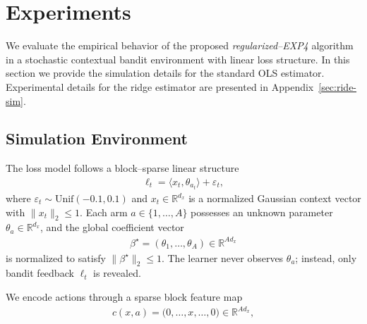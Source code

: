 \documentclass[11pt,letterpaper]{article}
\newcommand{\loss}{\ell}
\theoremstyle{plain}
\theoremstyle{definition}  %
\begin{document}
\section{Experiments}
\label{sec:exps}


We evaluate the empirical behavior of the proposed \emph{regularized–EXP4} algorithm in a stochastic contextual bandit environment with linear loss structure. In this section we provide the simulation details for the standard OLS estimator. Experimental details for the ridge estimator are presented in Appendix~\ref{sec:ride-sim}.

\subsection{Simulation Environment}


\noindent The loss model follows a block–sparse linear structure
\begin{align*}
    \loss_t = \langle x_t , \theta_{a_t} \rangle + \varepsilon_t,
\end{align*}
where $\varepsilon_t\sim\text{Unif}(-0.1,0.1)$ and $x_t\in\mathbb{R}^{d_x}$ is a normalized Gaussian context vector with $\|x_t\|_2 \le 1$. Each arm $a\in\{1,\dots,A\}$ possesses an unknown parameter $\theta_a\in\mathbb{R}^{d_x}$, and the global coefficient vector
\begin{align*}
    \beta^\star = (\theta_1,\dots,\theta_A) \in \mathbb{R}^{A d_x}
\end{align*}
is normalized to satisfy $\|\beta^\star\|_2 \le 1$. The learner never observes $\theta_a$; instead, only bandit feedback $\loss_t$ is revealed.

We encode actions through a sparse block feature map
\begin{align*}
    c(x,a) = \big(0,\dots,x,\dots,0\big) \in \mathbb{R}^{A d_x},
\end{align*}
\end{document}
